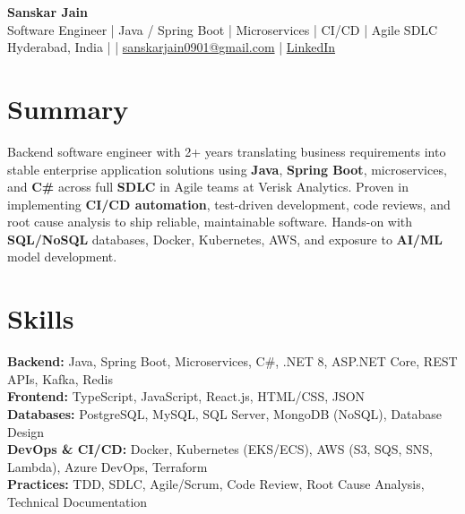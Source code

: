\documentclass[10pt,letterpaper]{article}
\begin{document}
\begin{center}
    {\Large \textbf{Sanskar Jain}} \\
    Software Engineer \;|\; Java / Spring Boot \;|\; Microservices \;|\; CI/CD \;|\; Agile SDLC \\
    Hyderabad, India \enspace |  \enspace | \enspace
    \href{mailto:sanskarjain0901@gmail.com}{sanskarjain0901@gmail.com} \enspace | \enspace
    \href{https://www.linkedin.com/in/sanskar-jain0901/}{LinkedIn}
\end{center}

\vspace{2pt}

\section*{Summary}
Backend software engineer with 2+ years translating business requirements into stable enterprise application solutions using \textbf{Java}, \textbf{Spring Boot}, microservices, and \textbf{C\#} across full \textbf{SDLC} in Agile teams at Verisk Analytics. Proven in implementing \textbf{CI/CD automation}, test-driven development, code reviews, and root cause analysis to ship reliable, maintainable software. Hands-on with \textbf{SQL/NoSQL} databases, Docker, Kubernetes, AWS, and exposure to \textbf{AI/ML} model development.

\section*{Skills}
\textbf{Backend:} Java, Spring Boot, Microservices, C\#, .NET 8, ASP.NET Core, REST APIs, Kafka, Redis \\
\textbf{Frontend:} TypeScript, JavaScript, React.js, HTML/CSS, JSON \\
\textbf{Databases:} PostgreSQL, MySQL, SQL Server, MongoDB (NoSQL), Database Design \\
\textbf{DevOps \& CI/CD:} Docker, Kubernetes (EKS/ECS), AWS (S3, SQS, SNS, Lambda), Azure DevOps, Terraform \\
\textbf{Practices:} TDD, SDLC, Agile/Scrum, Code Review, Root Cause Analysis, Technical Documentation
\end{document}
